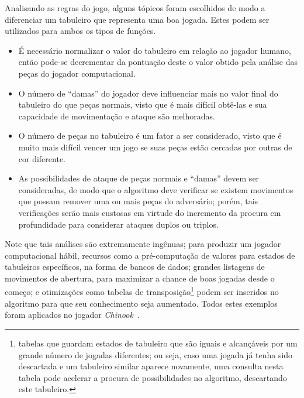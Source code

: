 \documentclass{../../sftex/sftex}
\begin{document}
\begin{enumerate}[label= (\textbf{\arabic*})]
    Analisando as regras do jogo, alguns tópicos foram escolhidos de modo a
    diferenciar um tabuleiro que representa uma boa jogada. Estes podem ser
    utilizados para ambos os tipos de funções.

    \begin{itemize}

        \item É necessário normalizar o valor do tabuleiro em relação ao
        jogador humano, então pode-se decrementar da pontuação deste o valor
        obtido pela análise das peças do jogador computacional.

        \item O número de ``damas'' do jogador deve influenciar mais no valor
        final do tabuleiro do que peças normais, visto que é mais difícil
        obtê-las e sua capacidade de movimentação e ataque são melhoradas.

        \item O número de peças no tabuleiro é um fator a ser considerado,
        visto que é muito mais difícil vencer um jogo se suas peças estão
        cercadas por outras de cor diferente.

        \item As possibilidades de ataque de peças normais e ``damas'' devem
        ser consideradas, de modo que o algoritmo deve verificar se existem
        movimentos que possam remover uma ou mais peças do adversário; porém,
        tais verificações serão mais custosas em virtude do incremento da
        procura em profundidade para considerar ataques duplos ou triplos.

    \end{itemize}

    Note que tais análises são extremamente ingênuas; para produzir um jogador
    computacional hábil, recursos como a pré-computação de valores para estados
    de tabuleiros específicos, na forma de bancos de dados; grandes listagens
    de movimentos de abertura, para maximizar a chance de boas jogadas desde o
    começo; e otimizações como tabelas de transposição\footnote{tabelas que
    guardam estados de tabuleiro que são iguais e alcançáveis por um grande
    número de jogadas diferentes; ou seja, caso uma jogada já tenha sido
    descartada e um tabuleiro similar aparece novamente, uma consulta nesta
    tabela pode acelerar a procura de possibilidades no algoritmo, descartando
    este tabuleiro.} podem ser inseridos no algoritmo para que seu conhecimento
    seja aumentado. Todos estes exemplos foram aplicados no jogador
    \textit{Chinook}~\cite{Schaeffer1989}.

\end{enumerate}



\end{document}
